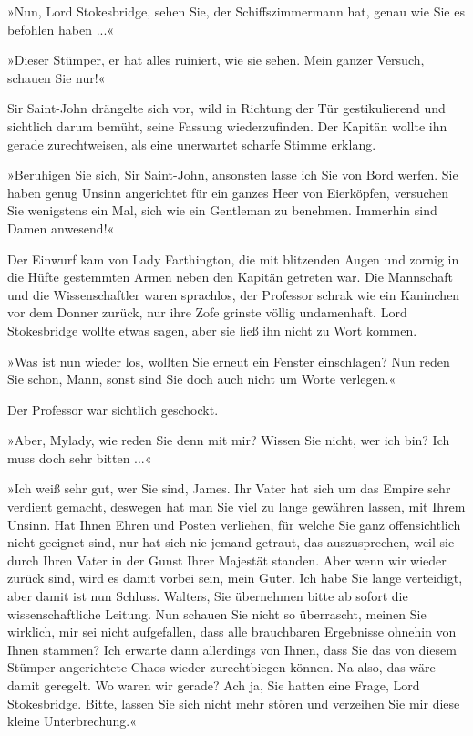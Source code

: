 »Nun, Lord Stokesbridge, sehen Sie, der Schiffszimmermann hat,
genau wie Sie es befohlen haben ...«

»Dieser Stümper, er hat alles ruiniert, wie sie sehen. Mein ganzer
Versuch, schauen Sie nur!«

Sir Saint-John drängelte sich vor, wild in Richtung der Tür
gestikulierend und sichtlich darum bemüht, seine Fassung
wiederzufinden. Der Kapitän wollte ihn gerade zurechtweisen, als
eine unerwartet scharfe Stimme erklang.

»Beruhigen Sie sich, Sir Saint-John, ansonsten lasse ich Sie von
Bord werfen. Sie haben genug Unsinn angerichtet für ein ganzes Heer
von Eierköpfen, versuchen Sie wenigstens ein Mal, sich wie ein
Gentleman zu benehmen. Immerhin sind Damen anwesend!«

Der Einwurf kam von Lady Farthington, die mit blitzenden Augen und
zornig in die Hüfte gestemmten Armen neben den Kapitän getreten
war. Die Mannschaft und die Wissenschaftler waren sprachlos, der
Professor schrak wie ein Kaninchen vor dem Donner zurück, nur ihre
Zofe grinste völlig undamenhaft. Lord Stokesbridge wollte etwas
sagen, aber sie ließ ihn nicht zu Wort kommen.

»Was ist nun wieder los, wollten Sie erneut ein Fenster
einschlagen? Nun reden Sie schon, Mann, sonst sind Sie doch auch
nicht um Worte verlegen.«

Der Professor war sichtlich geschockt.

»Aber, Mylady, wie reden Sie denn mit mir? Wissen Sie nicht, wer
ich bin? Ich muss doch sehr bitten ...«

»Ich weiß sehr gut, wer Sie sind, James. Ihr Vater hat sich um das
Empire sehr verdient gemacht, deswegen hat man Sie viel zu lange
gewähren lassen, mit Ihrem Unsinn. Hat Ihnen Ehren und Posten
verliehen, für welche Sie ganz offensichtlich nicht geeignet sind,
nur hat sich nie jemand getraut, das auszusprechen, weil sie durch
Ihren Vater in der Gunst Ihrer Majestät standen. Aber wenn wir
wieder zurück sind, wird es damit vorbei sein, mein Guter. Ich habe
Sie lange verteidigt, aber damit ist nun Schluss. Walters, Sie
übernehmen bitte ab sofort die wissenschaftliche Leitung. Nun
schauen Sie nicht so überrascht, meinen Sie wirklich, mir sei nicht
aufgefallen, dass alle brauchbaren Ergebnisse ohnehin von Ihnen
stammen? Ich erwarte dann allerdings von Ihnen, dass Sie das von
diesem Stümper angerichtete Chaos wieder zurechtbiegen können. Na
also, das wäre damit geregelt. Wo waren wir gerade? Ach ja, Sie
hatten eine Frage, Lord Stokesbridge. Bitte, lassen Sie sich nicht
mehr stören und verzeihen Sie mir diese kleine Unterbrechung.«

